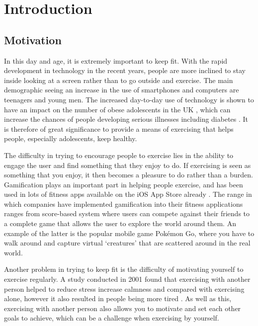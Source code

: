 \chapter{Introduction}

\section{Motivation}


In this day and age, it is extremely important to keep fit. With the rapid development in technology in the recent years, people are more inclined to stay inside looking at a screen rather than to go outside and exercise. The main demographic seeing an increase in the use of smartphones and computers are teenagers and young men. The increased day-to-day use of technology is shown to have an impact on the number of obese adolescents in the UK \cite{Kautiainen2005}, which can increase the chances of people developing serious illnesses including diabetes \cite{Lazar2005}. It is therefore of great significance to provide a means of exercising that helps people, especially adolescents, keep healthy.

The difficulty in trying to encourage people to exercise lies in the ability to engage the user and find something that they enjoy to do. If exercising is seen as something that you enjoy, it then becomes a pleasure to do rather than a burden. Gamification plays an important part in helping people exercise, and has been used in lots of fitness apps available on the iOS App Store already \cite{Lister2014}. The range in which companies have implemented gamification into their fitness applications ranges from score-based system where users can compete against their friends to a complete game that allows the user to explore the world around them. An example of the latter is the popular mobile game Pok\'{e}mon Go, where you have to walk around and capture virtual `creatures' that are scattered around in the real world.

Another problem in trying to keep fit is the difficulty of motivating yourself to exercise regularly. A study conducted in 2001 found that exercising with another person helped to reduce stress increase calmness and compared with exercising alone, however it also resulted in people being more tired \cite{Plante2001a}. As well as this, exercising with another person also allows you to motivate and set each other goals to achieve, which can be a challenge when exercising by yourself.

